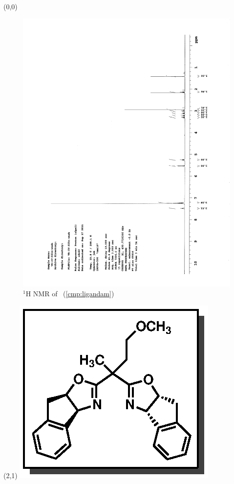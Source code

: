 \begin{textblock}{20}(0,0)
\begin{figure}[htb]
\caption{$^1$H NMR of \CMPligandam\ (\ref{cmp:ligandam})}
\includegraphics[scale=0.75, trim = 0mm 0mm 0mm 5mm,
clip]{chp_asymmetric/images/nmr/ligandamH}
\vspace{-100pt}
\end{figure}
\end{textblock}
\begin{textblock}{1}(2,1)
\includegraphics[scale=0.8, angle=90]{chp_asymmetric/images/ligandam}
\end{textblock}
